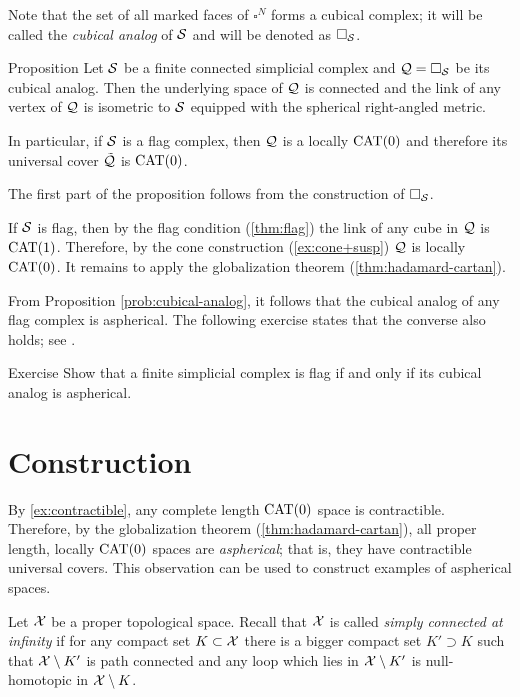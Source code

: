 Note that the set of all marked faces of $\square^{N}$
forms a cubical complex;
it will be called 
the \emph{cubical analog} of $\mathcal{S}$
and will be denoted as $\square_{\mathcal{S}}$.

\begin{thm}{Proposition}\label{prob:cubical-analog}
Let $\mathcal{S}$ be a finite connected simplicial complex
and $\mathcal{Q}=\square_{\mathcal{S}}$ be its cubical analog.
Then the underlying space of $\mathcal{Q}$ is connected 
and the link of any vertex of $\mathcal{Q}$
is isometric to  ${\mathcal{S}}$
equipped with the spherical right-angled metric.

In particular, if $\mathcal{S}$ is a flag complex,
then $\mathcal{Q}$ is a locally $\mathrm{CAT}(0)$
and therefore its universal cover $\tilde{\mathcal{Q}}$ is $\mathrm{CAT}(0)$.
\end{thm}

The first part of the proposition follows 
from the construction of $\square_{\mathcal{S}}$.

If ${\mathcal{S}}$ is flag, 
then by the flag condition (\ref{thm:flag}) 
the link of any cube in $\mathcal{Q}$ is $\mathrm{CAT}(1)$.
Therefore, by the cone construction (\ref{ex:cone+susp})
$\mathcal{Q}$
is locally $\mathrm{CAT}(0)$.
It remains to apply the globalization theorem 
(\ref{thm:hadamard-cartan}).
\qeds

From Proposition \ref{prob:cubical-analog}, 
it follows that the cubical analog
of any flag complex is aspherical.
The following exercise states that the  converse also holds; see \cite[5.4]{davis-2001}.

\begin{thm}{Exercise}\label{ex:flag-aspherical}
Show that a finite simplicial complex is flag 
if and only if its cubical analog is aspherical.
\end{thm}

\section{Construction}

By \ref{ex:contractible}, any complete length $\mathrm{CAT}(0)$ space is contractible.
Therefore, by  the globalization theorem (\ref{thm:hadamard-cartan}), all proper length, locally $\mathrm{CAT}(0)$ spaces 
are \emph{aspherical};
that is, they have contractible universal covers.
This observation can be used to construct examples of  aspherical spaces. 

Let $\mathcal{X}$ be a proper topological space.
Recall that $\mathcal{X}$ is called 
\emph{simply connected at infinity} 
if for any compact set $K\subset\mathcal{X}$
there is a bigger compact set $K'\supset K$
such that  $\mathcal{X}\setminus K'$ is path connected 
and any loop which lies in $\mathcal{X}\setminus K'$
is null-homotopic in  $\mathcal{X}\setminus K$.

